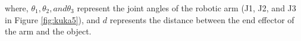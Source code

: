 \documentclass[12pt,oneside]{article}
\begin{document}
where, $\theta_1, \theta_2, and \theta_3$ represent the joint angles of the robotic arm (J1, J2, and J3 in Figure \ref{fig:kuka5}), and $d$ represents the distance between the end effector of the arm and the object. 


%
%
%
\end{document}
